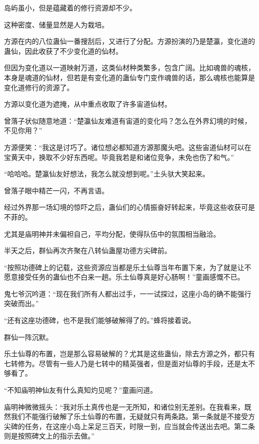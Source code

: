 
\begin{this_body}

岛屿虽小，但是蕴藏着的修行资源却不少。

这种密度、储量显然是人为栽培。

方源在内的八位蛊仙一番搜刮后，又进行了分配。方源扮演的乃是楚瀛，变化道的蛊仙，因此收获了不少变化道的仙材。

但因为变化道以一道映射万道，这类仙材种类繁多，包含广阔。比如魂兽的魂核，本身是魂道的仙材，但若是有变化道的蛊仙专门变作魂兽的话，那么魂核也能算是变化道修行的资源了。

方源以变化道为遮掩，从中重点收取了许多宙道仙材。

曾落子状似随意地道：“楚瀛仙友难道有宙道的变化吗？怎么在外界幻境的时候，不见你用？”

方源便笑：“我这是讨巧了。诸位想必都知道方源那魔头吧。这些宙道仙材可以在宝黄天中，换取不少好东西呢。毕竟我若是和诸位竞争，未免也伤了和气。”

“哈哈哈。楚瀛仙友好想法，我怎么就没想到呢。”土头驮大笑起来。

曾落子眼中精芒一闪，不再言语。

经过外界那一场幻境的惊吓之后，蛊仙们的心情振奋好转起来，毕竟这些收获可是不菲的。

尤其是庙明神并未偏袒自己，平均分配，使得队伍中的氛围相当融洽。

半天之后，群仙再次齐聚在八转仙蛊屋功德方尖碑前。

“按照功德碑上的记载，这些资源应当都是乐土仙尊当年布置下来，为了就是让不愿意接受任务的蛊仙也不白来一趟。乐土仙尊真是好心肠啊！”童画感慨不已。

鬼七爷沉吟道：“现在我们所有人都出过手，一一试探过，这座小岛的确不能强行突破而出。”

“还有这座功德碑，也不是我们能够破解得了的。”蜂将接着说。

群仙一阵沉默。

乐土仙尊的布置，岂是那么容易破解的？尤其是这些蛊仙，除去方源之外，都只有七转修为。尽管有一些人乃是七转中的精英强者，但是面对仙尊的手段，还是太不够看了。

“不知庙明神仙友有什么真知灼见呢？”童画问道。

庙明神微微摇头：“我对乐土真传也是一无所知，和诸位别无差别。在我看来，既然我们不能强行破解了乐土仙尊的布置，无疑就只有两条路。第一条就是不接受方尖碑的任务，在这座小岛上呆足三百天，时限一到，应当就会传送出去吧。第二条则是按照碑文上的指示去做。”


\end{this_body}

